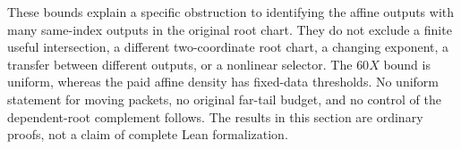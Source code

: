 These bounds explain a specific obstruction to identifying the
affine outputs with many same-index outputs in the original root
chart. They do not exclude a finite useful intersection, a different
two-coordinate root chart, a changing exponent, a transfer between
different outputs, or a nonlinear selector. The \(60X\) bound is
uniform, whereas the paid affine density has fixed-data thresholds.
No uniform statement for moving packets, no original far-tail
budget, and no control of the dependent-root complement follows.
The results in this section are ordinary proofs, not a claim of
complete Lean formalization.
